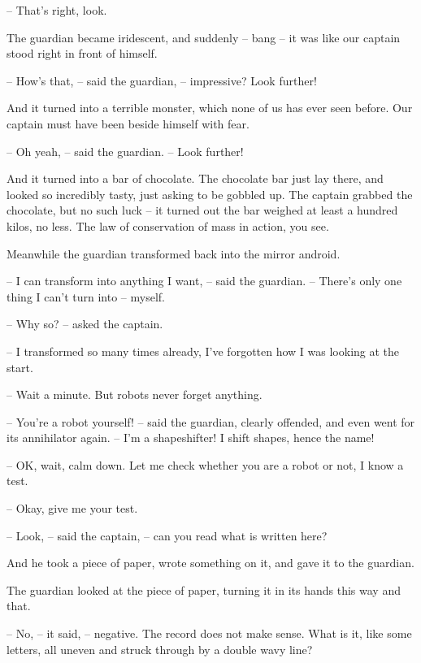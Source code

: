 \documentclass[ebook,oneside,final,openright]{memoir}
\begin{document}
– That’s right, look.\par
\par
The guardian became iridescent, and suddenly – bang – it was like our captain stood right in front of himself.\par
– How’s that, – said the guardian, – impressive? Look further!\par
And it turned into a terrible monster, which none of us has ever seen before. Our captain must have been beside himself with fear.\par
– Oh yeah, – said the guardian. – Look further!\par
\par
And it turned into a bar of chocolate. The chocolate bar just lay there, and looked so incredibly tasty, just asking to be gobbled up. The captain grabbed the chocolate, but no such luck – it turned out the bar weighed at least a hundred kilos, no less. The law of conservation of mass in action, you see.\par
\par
Meanwhile the guardian transformed back into the mirror android.\par
– I can transform into anything I want, – said the guardian. – There’s only one thing I can’t turn into – myself.\par
– Why so? – asked the captain.\par
– I transformed so many times already, I’ve forgotten how I was looking at the start.\par
– Wait a minute. But robots never forget anything.\par
– You’re a robot yourself! – said the guardian, clearly offended, and even went for its annihilator again. – I’m a shapeshifter! I shift shapes, hence the name!\par
– OK, wait, calm down. Let me check whether you are a robot or not, I know a test.\par
– Okay, give me your test.\par
– Look, – said the captain, – can you read what is written here?\par
And he took a piece of paper, wrote something on it, and gave it to the guardian.\par
The guardian looked at the piece of paper, turning it in its hands this way and that.\par
– No, – it said, – negative. The record does not make sense. What is it, like some letters, all uneven and struck through by a double wavy line?\par
\end{document}
